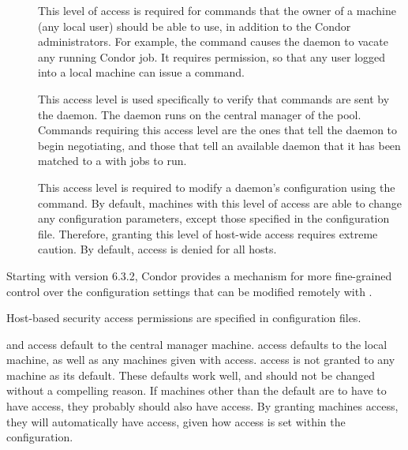 \begin{description}
\item[] \label{dcperm:owner} This level of access is
   required for commands that the owner of a machine (any local user)
   should be able to use, in addition to the Condor administrators.
   For example, the  command causes the
    daemon to vacate any running Condor job.
   It requires  permission,
   so that any user logged into a local machine
   can issue a  command.

\item[] \label{dcperm:negotiator} This 
   access level is used specifically to verify that commands are
   sent by the  daemon.
   The  daemon runs on the central manager of
   the pool.
   Commands requiring this access
   level are the ones that tell the  daemon to begin
   negotiating, and those that tell an available  daemon
   that it has been matched to a  with jobs to run.

\item[] \label{dcperm:config} This access level is
   required to modify a daemon's configuration using
   the  command.
   By default, machines with this level of access are able 
   to change any configuration parameters, except those specified in
   the  configuration file.
   Therefore, granting this level of host-wide access requires
   extreme caution.
   By default,  access is denied for all hosts.

\end{description}

Starting with version 6.3.2, Condor provides a mechanism for more
fine-grained control over the configuration settings that can be
modified remotely with .  

Host-based security access
permissions are specified in configuration files.

 and  access default to 
the central manager machine.
 access defaults to the local machine, as well as
any machines
given with  access.
 access is not granted to any machine
as its default.
These defaults work well, and should not be changed without
a compelling reason.
If machines other than the default are to have to have 
access, they probably should also have  access.
By granting machines  access, they
will automatically have  access, given how
 access is set within the configuration.

